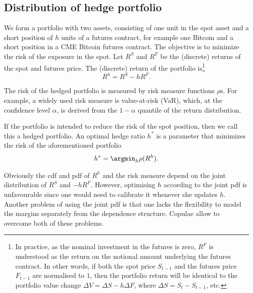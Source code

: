 \documentclass[11pt,a4paper,english]{article}
\providecommand{\natp}[1]{\textcolor{darkorange}{#1}}
\begin{document}
\subsection{Distribution of hedge portfolio}\label{subsec:DHP}
We form a portfolio with two assets, consisting of one unit in the
spot asset and a short position of $h$ units of a futures contract,
for example one Bitcoin and a short position in a CME Bitcoin
futures contract. 
The objective is to minimize the risk of the exposure in the spot. 
Let $R^S$ and $R^F$ be the (discrete) returns of the spot and
futures price. The (discrete) return of the portfolio is\footnote{%
In practice, as the nominal investment in the futures is zero, $R^F$
is understood as the return on the notional amount underlying the
futures contract. In other words, if both the spot price $S_{t-1}$
and the futures price $F_{t-1}$ are 
normalised to $1$, then the portfolio return will be identical to the
portfolio value change $\Delta V = \Delta S - h \Delta F$, where $\Delta S =
S_t-S_{t-1}$, etc.}
\begin{equation*}
R^h = R^S -h R^F.
\end{equation*}

The risk of the hedged portfolio is measured by risk measure functions $\rho$s.
For example, a widely used risk measure is value-at-risk (VaR), which,
at the confidence level $\alpha$,
is derived from the $1-\alpha$ quantile of the return distribution. %

If the portfolio is intended to reduce the risk of the spot position, then
we call this a hedged portfolio.
An optimal hedge ratio $h^*$ is a parameter that
minimizes the risk of the aforementioned portfolio
\begin{equation*}
h^* = \argmin_h \rho(R^h).
\end{equation*}

Obviously the cdf and pdf of $R^h$ and the risk measure depend on the
joint distribution of $R^S$ and $-hR^F$. However, optimising $h$
according to the joint pdf is unfavourable since one would need to
calibrate it whenever she updates $h$.
Another problem of using the joint pdf is that one lacks the
flexibility to model the margins separately from the dependence
structure. Copulae allow to overcome both of these problems. 
\end{document}
